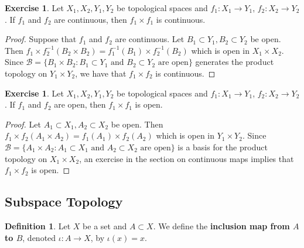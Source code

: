 \documentclass[12pt]{amsart}
\theoremstyle{definition}
\newtheorem{defn}[definition]{Definition}
\newtheorem{ex}[definition]{Exercise}
\newcommand{\MB}{\mathcal{B}}
\begin{document}
	\begin{ex}
		Let $X_1, X_2,Y_1,Y_2$ be topological spaces and $f_1:X_1 \rightarrow Y_1$, $f_2:X_2 \rightarrow Y_2$. If $f_1$ and $f_2$ are continuous, then $f_1 \times f_1$ is continuous.
	\end{ex}

	\begin{proof}
		Suppose that $f_1$ and $f_2$ are continuous. Let $B_1 \subset Y_1, B_2 \subset Y_2$ be open. Then $f_1 \times f_2^{-1}(B_2 \times B_2) = f_1^{-1}(B_1) \times f_2^{-1}(B_2) $ which is open in $X_1 \times X_2$. Since  $\MB = \{B_1 \times B_2:  \text{$B_1 \subset Y_1$ and $B_2 \subset Y_2$ are open} \}$ generates the product topology on $Y_1 \times Y_2$, we have that $f_1 \times f_2$ is continuous.
	\end{proof}

	\begin{ex}
		Let $X_1, X_2,Y_1,Y_2$ be topological spaces and $f_1:X_1 \rightarrow Y_1$, $f_2:X_2 \rightarrow Y_2$. If $f_1$ and $f_2$ are open, then $f_1 \times f_1$ is open.
	\end{ex}
	
	\begin{proof}
		Let $A_1 \subset X_1, A_2 \subset X_2$ be open. Then $f_1 \times f_2(A_1 \times A_2) = f_1(A_1) \times f_2(A_2)$ which is open in $Y_1 \times Y_2$. Since $\MB = \{A_1 \times A_2:  \text{$A_1 \subset X_1$ and $A_2 \subset X_2$ are open} \}$ is a basis for the product topology on $X_1 \times X_2$, an exercise in the section on continuous maps implies that $f_1 \times f_2$ is open.
	\end{proof}
	
	
	
	
	
	
	
	
	
	
	
	
	
	
	
	
	
	
	
	
	
	
	
	
	
	
	\newpage
	\subsection{Subspace Topology}
	
	\begin{defn}
	Let $X$ be a set and $A \subset X$. We define the \textbf{inclusion map from $A$ to $B$}, denoted $\iota: A \rightarrow X$, by $\iota(x) = x$. 
	\end{defn}
	
\end{document}
